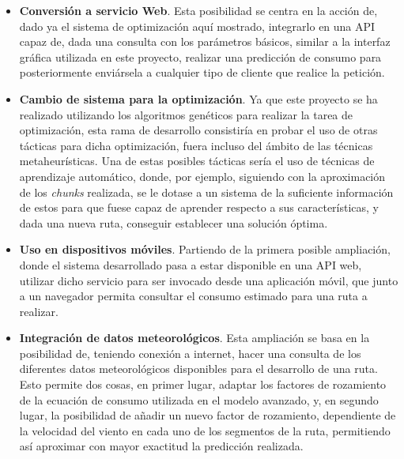 \documentclass[11pt,spanish,listoffigures,listoftables]{tfgetsinf}
\begin{document}
\begin{itemize}
    \item \textbf{Conversión a servicio Web}. Esta posibilidad se centra en la acción de, dado ya el sistema de optimización aquí mostrado, integrarlo en una API capaz de, dada una consulta con los parámetros básicos, similar a la interfaz gráfica utilizada en este proyecto, realizar una predicción de consumo para posteriormente enviársela a cualquier tipo de cliente que realice la petición.
    
    \item \textbf{Cambio de sistema para la optimización}. Ya que este proyecto se ha realizado utilizando los algoritmos genéticos para realizar la tarea de optimización, esta rama de desarrollo consistiría en probar el uso de otras tácticas para dicha optimización, fuera incluso del ámbito de las técnicas metaheurísticas. Una de estas posibles tácticas sería el uso de técnicas de aprendizaje automático, donde, por ejemplo, siguiendo con la aproximación de los \textit{chunks} realizada, se le dotase a un sistema de la suficiente información de estos para que fuese capaz de aprender respecto a sus características, y dada una nueva ruta, conseguir establecer una solución óptima.
    
    \item \textbf{Uso en dispositivos móviles}. Partiendo de la primera posible ampliación, donde el sistema desarrollado pasa a estar disponible en una API web, utilizar dicho servicio para ser invocado desde una aplicación móvil, que junto a un navegador permita consultar el consumo estimado para una ruta a realizar.
    
    \item \textbf{Integración de datos meteorológicos}. Esta ampliación se basa en la posibilidad de, teniendo conexión a internet, hacer una consulta de los diferentes datos meteorológicos disponibles para el desarrollo de una ruta. Esto permite dos cosas, en primer lugar, adaptar los factores de rozamiento de la ecuación de consumo utilizada en el modelo avanzado, y, en segundo lugar, la posibilidad de añadir un nuevo factor de rozamiento, dependiente de la velocidad del viento en cada uno de los segmentos de la ruta, permitiendo así aproximar con mayor exactitud la predicción realizada.
\end{itemize}


\nocite{*}
\printbibliography
\end{document}

